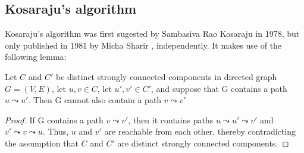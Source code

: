 \subsection{Kosaraju's algorithm} \label{algorithm-scc-kosaraju}
Kosaraju's algorithm was first sugested by Sambasiva Rao Kosaraju in 1978, but only published in 1981 by Micha Sharir \cite{sharir81}, independently. It makes use of the following lemma:
\begin{lemma} \label{lem:kosaraju1}
    Let $C$ and $C'$ be distinct strongly connected components in directed graph $G=(V,E)$, let $u,v \in C$, let $u',v' \in C'$, and suppose that G contains a path $u \leadsto u'$. Then G cannot also contain a path $v \leadsto v'$
\end{lemma}
\begin{proof}
    If G contains a path $v \leadsto v'$, then it contains paths $u \leadsto u' \leadsto v'$ and $v' \leadsto v \leadsto u$. Thus, $u$ and $v'$ are reachable from each other, thereby contradicting the assumption that $C$ and $C'$ are distinct strongly connected components.
\end{proof}
